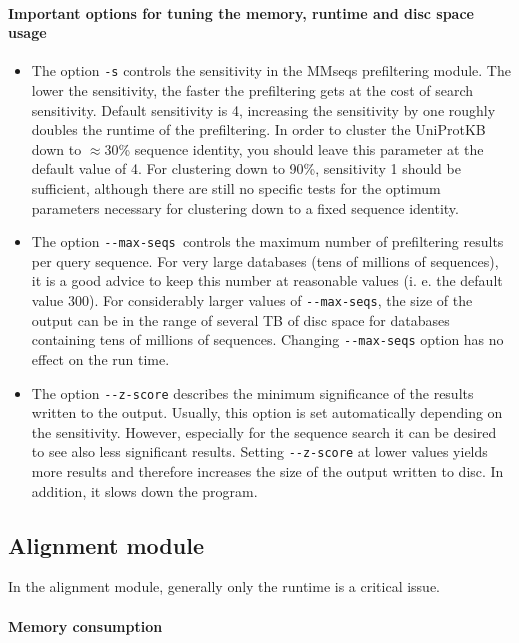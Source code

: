 \documentclass[11pt,a4paper]{report}
\begin{document}
\paragraph{Important options for tuning the memory, runtime and disc space usage}
\begin{itemize}
\item The option \texttt{-s} controls the sensitivity in the MMseqs prefiltering
module. The lower the sensitivity, the faster the prefiltering gets
at the cost of search sensitivity. Default sensitivity is 4, increasing
the sensitivity by one roughly doubles the runtime of the prefiltering.
In order to cluster the UniProtKB down to $\approx$30\% sequence
identity, you should leave this parameter at the default value of
4. For clustering down to 90\%, sensitivity 1 should be sufficient,
although there are still no specific tests for the optimum parameters
necessary for clustering down to a fixed sequence identity.
\item The option \texttt{-{}-max-seqs }controls the maximum number of prefiltering
results per query sequence. For very large databases (tens of millions
of sequences), it is a good advice to keep this number at reasonable
values (i. e. the default value 300). For considerably larger values
of \texttt{-{}-max-seqs}, the size of the output can be in the range
of several TB of disc space for databases containing tens of millions
of sequences. Changing \texttt{-{}-max-seqs} option has no effect
on the run time.
\item The option \texttt{-{}-z-score} describes the minimum significance
of the results written to the output. Usually, this option is set
automatically depending on the sensitivity. However, especially for
the sequence search it can be desired to see also less significant
results. Setting \texttt{-{}-z-score} at lower values yields more
results and therefore increases the size of the output written to
disc. In addition, it slows down the program.
\end{itemize}

\subsection{Alignment module}

In the alignment module, generally only the runtime is a critical
issue.


\paragraph{Memory consumption}
\end{document}
